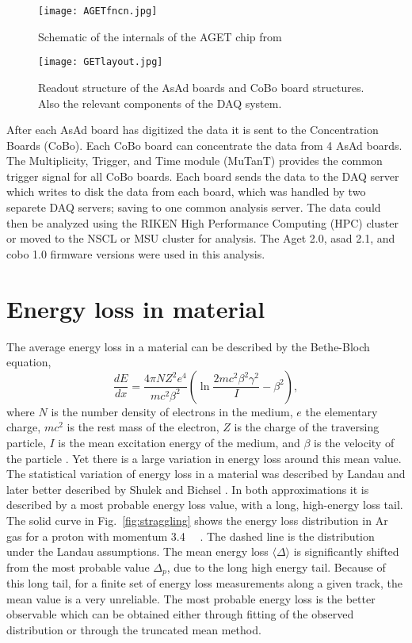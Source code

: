 \begin{figure}[!htb]
\centering
\texttt{[image: AGETfncn.jpg]}
\caption{Schematic of the internals of the AGET chip from \cite{get2}}
\label{fig:aget}
\end{figure}


\begin{figure}[!htb]
\centering
\texttt{[image: GETlayout.jpg]}
\caption{Readout structure of the AsAd boards and CoBo board structures. Also the relevant components of the DAQ system.}
\label{fig:coboDAQ}
\end{figure}

After each AsAd board has digitized the data it is sent to the Concentration Boards (CoBo). Each CoBo board can concentrate the data from 4 AsAd boards. The Multiplicity, Trigger, and Time module (MuTanT) \cite{get} provides the common trigger signal for all CoBo boards.  Each board sends the data to the DAQ server which writes to disk the data from each board, which was handled by two separete DAQ servers; saving to one common analysis server. The data could then be analyzed using the RIKEN High Performance Computing (HPC) cluster or moved to the NSCL or MSU cluster for analysis. The Aget 2.0, asad 2.1, and cobo 1.0 firmware versions were used in this analysis. 

\section{Energy loss in material}
\label{sec:energyloss}

The average energy loss in a material can be described by the Bethe-Bloch equation,
\begin{equation}\label{eq:bb}
\frac{dE}{dx} = \frac{4\pi NZ^2e^4}{mc^2\beta^2} (\ln \frac{2mc^2\beta^2\gamma^2}{I} - \beta^2),
\end{equation}
where $N$ is the number density of electrons in the medium, $e$ the elementary charge, $mc^2$ is the rest mass of the electron, $Z$ is the charge of the traversing particle, $I$ is the mean excitation energy of the medium, and $\beta$ is the velocity of the particle \cite{blumrol}. Yet there is a large variation in energy loss around this mean value. The statistical variation of energy loss in a material was described by Landau \cite{landau} and later better described by Shulek \cite{shulek} and Bichsel \cite{bichsel1}. In both approximations it is described by a most probable energy loss value, with a long, high-energy loss tail. The solid curve in Fig.~\ref{fig:straggling} shows the energy loss distribution in Ar gas for a proton with momentum \SI{3.4}{\giga\eVperc} \cite{bichsel}. The dashed line is the distribution under the Landau assumptions. The mean energy loss $\langle\Delta\rangle$ is significantly shifted from the most probable value $\Delta_p$, due to the long high energy tail.  Because of this long tail, for a finite set of energy loss measurements along a given track, the mean value is a very unreliable. The most probable energy loss is the better observable which can be obtained either through fitting of the observed distribution or through the truncated mean method. 

